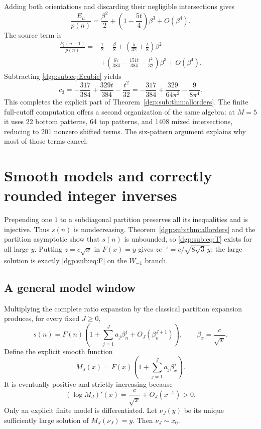 \documentclass[11pt,letterpaper]{article}
\numberwithin{equation}{section}
\theoremstyle{remark}\newtheorem{remark}[theorem]{Remark}
\begin{document}
Adding both orientations and discarding their negligible
intersections gives
\begin{equation}\label{dgp:sub:eq:Ecubic}
 \frac{E_n}{p(n)}=\frac{\beta^2}2+\left(1-\frac{5t}4\right)\beta^3
                      +O(\beta^4).
\end{equation}
The source term is
\begin{align}\label{dgp:sub:eq:sourcecubic}
 \frac{P_1(n-1)}{p(n)}={}&\frac12-\frac\beta8
 +\left(\frac5{32}+\frac t8\right)\beta^2\nonumber\\
 &+\left(\frac{67}{384}-\frac{151t}{384}-\frac{t^2}{32}\right)\beta^3
 +O(\beta^4).
\end{align}
Subtracting \eqref{dgp:sub:eq:Ecubic} yields
\[
 c_3=-\frac{317}{384}+\frac{329t}{384}-\frac{t^2}{32}
     =-\frac{317}{384}+\frac{329}{64\pi^2}-\frac9{8\pi^4}.
\]
This completes the explicit part of Theorem~\ref{dgp:sub:thm:allorders}.
The finite full-cutoff computation offers a second organization of
the same algebra: at $M=5$ it uses 22 bottom patterns, 64 top patterns,
and 1408 mixed intersections, reducing to 201 nonzero shifted terms.
The six-pattern argument explains why most of those terms cancel.

\section{Smooth models and correctly rounded integer inverses}\label{dgp:sub:sec:inverse}
Prepending one $1$ to a subdiagonal partition preserves all its
inequalities and is injective. Thus $s(n)$ is nondecreasing.
Theorem~\ref{dgp:sub:thm:allorders} and the partition asymptotic show that
$s(n)$ is unbounded, so \eqref{dgp:sub:eq:T} exists for all large $y$.
Putting $z=c\sqrt{x}$ in $F(x)=y$ gives
$ze^{-z}=c/\sqrt{8\sqrt3\,y}$; the large solution is exactly
\eqref{dgp:sub:eq:F} on the $W_{-1}$ branch.

\subsection{A general model window}
Multiplying the complete ratio expansion by the classical partition
expansion produces, for every fixed $J\geq0$,
\begin{equation}\label{dgp:sub:eq:countmodel}
 s(n)=F(n)\left(1+\sum_{j=1}^{J}a_j\beta_n^j
                       +O_J(\beta_n^{J+1})\right),
 \qquad\beta_x=\frac c{\sqrt{x}}.
\end{equation}
Define the explicit smooth function
\begin{equation}\label{dgp:sub:eq:MJ}
 M_J(x)=F(x)\left(1+\sum_{j=1}^{J}a_j\beta_x^j\right).
\end{equation}
It is eventually positive and strictly increasing because
\begin{equation}\label{dgp:sub:eq:MJderiv}
 (\log M_J)'(x)=\frac c{\sqrt{x}}+O_J(x^{-1})>0.
\end{equation}
Only an explicit finite model is differentiated. Let $\nu_J(y)$ be
its unique sufficiently large solution of $M_J(\nu_J)=y$.
Then $\nu_J\sim x_0$.
\end{document}
